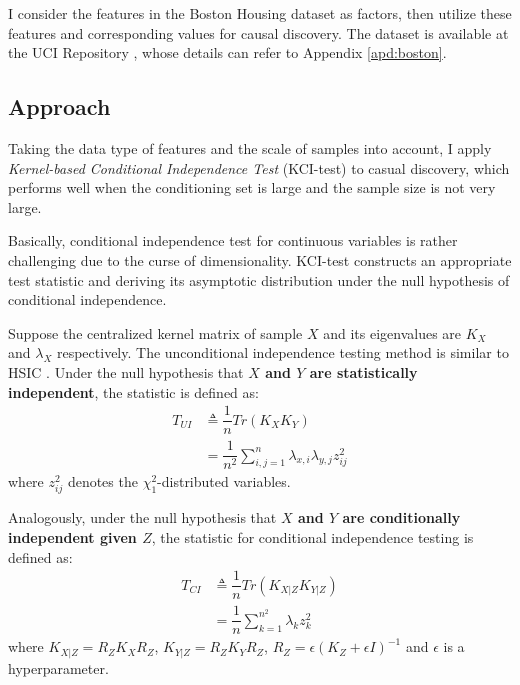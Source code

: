\documentclass[12pt,a4paper]{article}
\theoremstyle{definition}
\begin{document}
\vspace{0.008\linewidth}
I consider the features in the Boston Housing dataset as factors, then utilize these features and corresponding values for causal discovery. The dataset is available at the UCI Repository \cite{boston}, whose details can refer to Appendix \ref{apd:boston}.

\subsection{Approach}
\label{sec:appro}

Taking the data type of features and the scale of samples into account, I apply \textit{Kernel-based Conditional Independence Test} (KCI-test) \cite{alg} to casual discovery, which performs well when the conditioning set is large and the sample size is not very large.

\vspace{0.008\linewidth}
Basically, conditional independence test for continuous variables is rather challenging due to the curse of dimensionality. KCI-test constructs an appropriate test statistic and deriving its asymptotic distribution under the null hypothesis of conditional independence.

\vspace{0.008\linewidth}
Suppose the centralized kernel matrix of sample $X$ and its eigenvalues are $K_X$ and $\lambda_X$ respectively. The unconditional independence testing method is similar to HSIC \cite{HSIC}. Under the null hypothesis that \textbf{$X$ and $Y$ are statistically independent}, the statistic is defined as:
\begin{align*}
	T_{UI} & \triangleq \dfrac{1}{n}Tr(K_{X}K_{Y}) \\
	& = \dfrac{1}{n^2}\sum_{i,j=1}^{n}\lambda_{x,i}\lambda_{y,j}z^2_{ij}
\end{align*}
where $z^2_{ij}$ denotes the $\chi^2_1$-distributed variables.

\vspace{0.008\linewidth}
Analogously, under the null hypothesis that \textbf{$X$ and $Y$ are conditionally independent given $Z$}, the statistic for conditional independence testing is defined as:
\begin{align*}
	T_{CI} & \triangleq \dfrac{1}{n}Tr(K_{X|Z}K_{Y|Z}) \\
	& = \dfrac{1}{n}\sum_{k=1}^{n^2}\lambda_{k}z^2_{k}
\end{align*}
where $K_{X|Z}=R_ZK_XR_Z$, $K_{Y|Z}=R_ZK_YR_Z$, $R_Z=\epsilon(K_Z+\epsilon I)^{-1}$ and $\epsilon$ is a hyperparameter.
\end{document}
